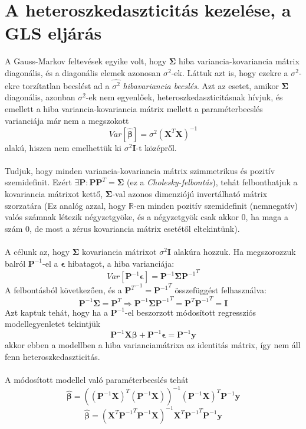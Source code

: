 \documentclass[14p]{report}
\def\pmb{\boldsymbol}
\def\ebeta{\hat{\pmb{\beta}}}
\def\e{\epsilon}
\begin{document}
	\section{A heteroszkedaszticitás kezelése, a GLS eljárás}
	A Gauss-Markov feltevések egyike volt, hogy $\pmb{\Sigma}$ hiba variancia-kovariancia mátrix diagonális, és a diagonális elemek azonosan $\sigma^2$-ek. Láttuk azt is, hogy ezekre a $\sigma^2$-ekre torzítatlan becslést ad a $\widehat{\sigma^2}$ \emph{hibavariancia becslés}. Azt az esetet, amikor $\pmb{\Sigma}$ diagonális, azonban $\sigma^2$-ek nem egyenlőek, heteroszkedaszticitásnak hívjuk, és emellett a hiba variancia-kovariancia mátrix mellett a paraméterbecslés varianciája már nem a megszokott
	\[
		Var[\ebeta] = \sigma^2(\pmb{X}^T\pmb{X})^{-1}
	\]
	alakú, hiszen nem emelhettük ki $\sigma^2\pmb{I}$-t középről.
	\\
	\\
	Tudjuk, hogy minden variancia-kovariancia mátrix szimmetrikus és pozitív szemidefinit. Ezért $\exists \pmb{P} : \pmb{P}\pmb{P}^T = \pmb{\Sigma}$ (ez a \emph{Cholesky-felbontás}), tehát felbonthatjuk a kovariancia mátrixot kettő, $\pmb{\Sigma}$-val azonos dimenziójú invertálható mátrix szorzatára (Ez analóg azzal, hogy $\mathbb{R}$-en minden pozitív szemidefinit (nemnegatív) valós számnak létezik négyzetgyöke, és a négyzetgyök csak akkor $0$, ha maga a szám $0$, de most a zérus kovariancia mátrix esetétől eltekintünk).
	\\
	\\
	A célunk az, hogy $\pmb{\Sigma}$ kovariancia mátrixot $\sigma^2\pmb{I}$ alakúra hozzuk. Ha megszorozzuk balról $\pmb{P}^{-1}$-el a $\pmb{\e}$ hibatagot, a hiba varianciája:
	\[
		Var[\pmb{P}^{-1}\pmb{\e}] = \pmb{P}^{-1}\pmb{\Sigma}{\pmb{P}^{-1}}^T
	\]
	A felbontásból következően, és a ${\pmb{P}^T}^{-1} = {\pmb{P}^{-1}}^T$ összefüggést felhasználva:
	\[
		\pmb{P}^{-1}\pmb{\Sigma} = \pmb{P}^T \Longrightarrow \pmb{P}^{-1}\pmb{\Sigma}{\pmb{P}^{-1}}^T = \pmb{P}^T{\pmb{P}^{-1}}^T = \pmb{I}
	\]
	Azt kaptuk tehát, hogy ha a $\pmb{P}^{-1}$-el beszorzott módosított regressziós modellegyenletet tekintjük
	\[
		\pmb{P}^{-1}\pmb{X}\pmb{\beta} + \pmb{P}^{-1}\pmb{\e} = \pmb{P}^{-1}\pmb{y}
	\]
	akkor ebben a modellben a hiba varianciamátrixa az identitás mátrix, így nem áll fenn heteroszkedaszticitás.
	\\
	\\
	A módosított modellel való paraméterbecslés tehát
	\[
		\ebeta = ((\pmb{P}^{-1}\pmb{X})^T(\pmb{P}^{-1}\pmb{X}))^{-1}(\pmb{P}^{-1}\pmb{X})^T\pmb{P}^{-1}\pmb{y}
	\]
	\[
		\ebeta = (\pmb{X}^T{\pmb{P}^{-1}}^T\pmb{P}^{-1}\pmb{X})^{-1}\pmb{X}^T{\pmb{P}^{-1}}^T\pmb{P}^{-1}\pmb{y}
	\]
\end{document}
